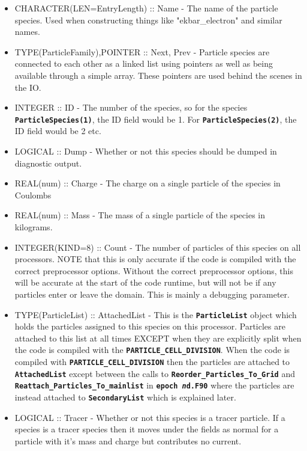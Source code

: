 \documentclass[12pt]{article}
\newcommand{\inlinecode}[1]{{\color{warwickred} \bf\texttt{#1}}}
\begin{document}
\begin{itemize}
\item CHARACTER(LEN=EntryLength) :: Name - The name of the particle
  species. Used when constructing things like "ekbar\_electron" and similar
  names.
\item TYPE(ParticleFamily),POINTER :: Next, Prev - Particle species are
  connected to each other as a linked list using pointers as well as being
  available through a simple array. These pointers are used behind the scenes
  in the IO.
\item INTEGER :: ID - The number of the species, so for the species
  \inlinecode{ParticleSpecies(1)}, the ID field would be 1. For
  \inlinecode{ParticleSpecies(2)}, the ID field would be 2 etc.
\item LOGICAL :: Dump - Whether or not this species should be dumped in
  diagnostic output.
\item REAL(num) :: Charge - The charge on a single particle of the species in
  Coulombs
\item REAL(num) :: Mass - The mass of a single particle of the species in
  kilograms.
\item INTEGER(KIND=8) :: Count - The number of particles of this species on
  all processors. NOTE that this is only accurate if the code is compiled with
  the correct preprocessor options. Without the correct preprocessor options,
  this will be accurate at the start of the code runtime, but will not be if
  any particles enter or leave the domain. This is mainly a debugging
  parameter.
\item TYPE(ParticleList) :: AttachedList - This is the
  \inlinecode{ParticleList} object which holds the particles assigned to this
  species on this processor. Particles are attached to this list at all times
  EXCEPT when they are explicitly split when the code is compiled with the
  \inlinecode{PARTICLE\_CELL\_DIVISION}. When the code is compiled with
  \inlinecode{PARTICLE\_CELL\_DIVISION} then the particles are attached to
  \inlinecode{AttachedList} except between the calls to
  \inlinecode{Reorder\_Particles\_To\_Grid} and
  \inlinecode{Reattach\_Particles\_To\_mainlist} in \inlinecode{epoch{\it
      n}d.F90} where the particles are instead attached to
  \inlinecode{SecondaryList} which is explained later.
\item LOGICAL :: Tracer - Whether or not this species is a tracer particle. If
  a species is a tracer species then it moves under the fields as normal for a
  particle with it's mass and charge but contributes no current.

\end{itemize}
\end{document}

